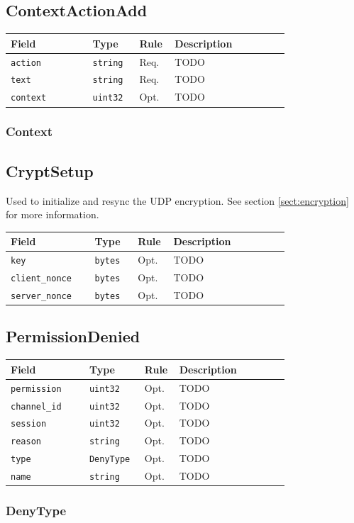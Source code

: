 \documentclass[11pt]{article} %
\newenvironment{mumbleMessageEx}
{%
	\small
	\renewcommand\arraystretch{1.5}
	\begin{tabular}{p{0.25\linewidth}p{0.13\linewidth}p{0.05\linewidth}p{0.35\linewidth}}
	Field & Type & Rule & Description \\
	\hline
}
{%
	\end{tabular}
	\renewcommand\arraystretch{1.0}
}
\newcommand{\mumbleMessageExItem}[4]{ \texttt{#1} & \texttt{#2} & #3 & #4 \\ }
\begin{document}
\subsection{ContextActionAdd}

\begin{mumbleMessageEx}
\mumbleMessageExItem{action}{string}{Req.}{TODO}
\mumbleMessageExItem{text}{string}{Req.}{TODO}
\mumbleMessageExItem{context}{uint32}{Opt.}{TODO}
\end{mumbleMessageEx}

\subsubsection{Context}

\subsection{CryptSetup}

Used to initialize and resync the UDP encryption. See section \ref{sect:encryption} for more information.

\begin{mumbleMessageEx}
\mumbleMessageExItem{key}{bytes}{Opt.}{TODO}
\mumbleMessageExItem{client\_nonce}{bytes}{Opt.}{TODO}
\mumbleMessageExItem{server\_nonce}{bytes}{Opt.}{TODO}
\end{mumbleMessageEx}

\subsection{PermissionDenied}

\begin{mumbleMessageEx}
\mumbleMessageExItem{permission}{uint32}{Opt.}{TODO}
\mumbleMessageExItem{channel\_id}{uint32}{Opt.}{TODO}
\mumbleMessageExItem{session}{uint32}{Opt.}{TODO}
\mumbleMessageExItem{reason}{string}{Opt.}{TODO}
\mumbleMessageExItem{type}{DenyType}{Opt.}{TODO}
\mumbleMessageExItem{name}{string}{Opt.}{TODO}
\end{mumbleMessageEx}

\subsubsection{DenyType}

\end{document}
